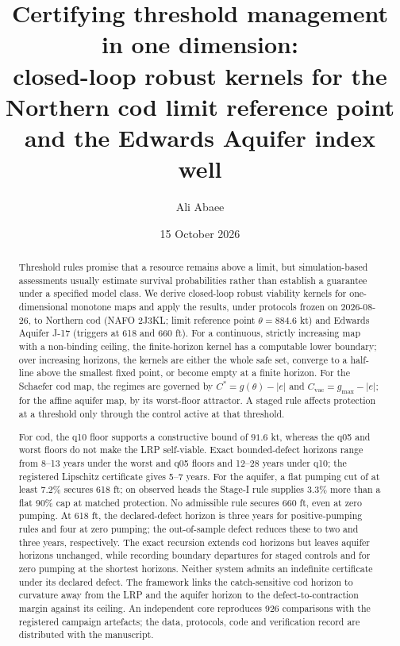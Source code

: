 \documentclass[11pt,a4paper]{article}
\title{\textbf{Certifying threshold management in one dimension:\\ closed-loop robust kernels for the Northern cod limit reference point and the Edwards Aquifer index well}}
\author{Ali Abaee}
\date{15 October 2026}
\theoremstyle{plain}
\theoremstyle{definition}
\theoremstyle{remark}
\begin{document}
\maketitle

\begin{abstract}
\noindent
Threshold rules promise that a resource remains above a limit, but simulation-based assessments usually estimate survival probabilities rather than establish a guarantee under a specified model class. We derive closed-loop robust viability kernels for one-dimensional monotone maps and apply the results, under protocols frozen on 2026-08-26, to Northern cod (NAFO 2J3KL; limit reference point $\theta=884.6$ kt) and Edwards Aquifer J-17 (triggers at 618 and 660 ft). For a continuous, strictly increasing map with a non-binding ceiling, the finite-horizon kernel has a computable lower boundary; over increasing horizons, the kernels are either the whole safe set, converge to a half-line above the smallest fixed point, or become empty at a finite horizon. For the Schaefer cod map, the regimes are governed by $C^*=g(\theta)-|e|$ and $C_{\mathrm{vac}}=g_{\max}-|e|$; for the affine aquifer map, by its worst-floor attractor. A staged rule affects protection at a threshold only through the control active at that threshold.

For cod, the q10 floor supports a constructive bound of $91.6$ kt, whereas the q05 and worst floors do not make the LRP self-viable. Exact bounded-defect horizons range from 8--13 years under the worst and q05 floors and 12--28 years under q10; the registered Lipschitz certificate gives 5--7 years. For the aquifer, a flat pumping cut of at least 7.2\% secures 618 ft; on observed heads the Stage-I rule supplies 3.3\% more than a flat 90\% cap at matched protection. No admissible rule secures 660 ft, even at zero pumping. At 618 ft, the declared-defect horizon is three years for positive-pumping rules and four at zero pumping; the out-of-sample defect reduces these to two and three years, respectively. The exact recursion extends cod horizons but leaves aquifer horizons unchanged, while recording boundary departures for staged controls and for zero pumping at the shortest horizons. Neither system admits an indefinite certificate under its declared defect. The framework links the catch-sensitive cod horizon to curvature away from the LRP and the aquifer horizon to the defect-to-contraction margin against its ceiling. An independent core reproduces 926 comparisons with the registered campaign artefacts; the data, protocols, code and verification record are distributed with the manuscript.
\end{abstract}
\end{document}

